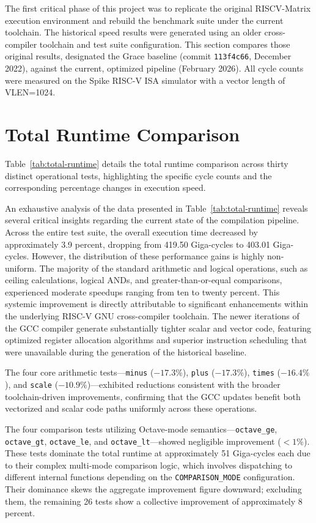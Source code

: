 The first critical phase of this project was to replicate the original RISCV-Matrix execution environment and rebuild the benchmark suite under the current toolchain. The historical speed results were generated using an older cross-compiler toolchain and test suite configuration. This section compares those original results, designated the Grace baseline (commit \texttt{113f4c66}, December 2022), against the current, optimized pipeline (February 2026). All cycle counts were measured on the Spike RISC-V ISA simulator with a vector length of VLEN=1024.

\section{Total Runtime Comparison}

Table~\ref{tab:total-runtime} details the total runtime comparison across thirty distinct operational tests, highlighting the specific cycle counts and the corresponding percentage changes in execution speed.



An exhaustive analysis of the data presented in Table~\ref{tab:total-runtime} reveals several critical insights regarding the current state of the compilation pipeline. Across the entire test suite, the overall execution time decreased by approximately 3.9 percent, dropping from 419.50 Giga-cycles to 403.01 Giga-cycles. However, the distribution of these performance gains is highly non-uniform. The majority of the standard arithmetic and logical operations, such as ceiling calculations, logical ANDs, and greater-than-or-equal comparisons, experienced moderate speedups ranging from ten to twenty percent. This systemic improvement is directly attributable to significant enhancements within the underlying RISC-V GNU cross-compiler toolchain. The newer iterations of the GCC compiler generate substantially tighter scalar and vector code, featuring optimized register allocation algorithms and superior instruction scheduling that were unavailable during the generation of the historical baseline.

The four core arithmetic tests---\texttt{minus} ($-17.3\%$), \texttt{plus} ($-17.3\%$), \texttt{times} ($-16.4\%$), and \texttt{scale} ($-10.9\%$)---exhibited reductions consistent with the broader toolchain-driven improvements, confirming that the GCC updates benefit both vectorized and scalar code paths uniformly across these operations.

The four comparison tests utilizing Octave-mode semantics---\texttt{octave\_ge}, \texttt{octave\_gt}, \texttt{octave\_le}, and \texttt{octave\_lt}---showed negligible improvement ($<1\%$). These tests dominate the total runtime at approximately 51 Giga-cycles each due to their complex multi-mode comparison logic, which involves dispatching to different internal functions depending on the \texttt{COMPARISON\_MODE} configuration. Their dominance skews the aggregate improvement figure downward; excluding them, the remaining 26 tests show a collective improvement of approximately 8 percent.

